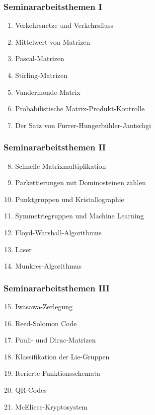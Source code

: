 %
%
%
\begin{frame}
\frametitle{Seminararbeitsthemen I}
\begin{enumerate}[<+->]
\item
Verkehrsnetze und Verkehrsfluss
\item
Mittelwert von Matrizen
\item
Pascal-Matrizen
\item 
Stirling-Matrizen
\item
Vandermonde-Matrix
\item
Probabilistische Matrix-Produkt-Kontrolle
\item
Der Satz von Furrer-Hungerbühler-Jantschgi
\end{enumerate}
\end{frame}

\begin{frame}
\frametitle{Seminararbeitsthemen II}
\begin{enumerate}[<+->]
\setcounter{enumi}{7}
\item
Schnelle Matrixmultiplikation
\item
Parkettierungen mit Dominosteinen zählen
\item
Punktgruppen und Kristallographie
\item
Symmetriegruppen und Machine Learning
\item
Floyd-Warshall-Algorithmus
\item
Laser
\item
Munkres-Algorithmus
\end{enumerate}
\end{frame}

\begin{frame}
\frametitle{Seminararbeitsthemen III}
\begin{enumerate}[<+->]
\setcounter{enumi}{14}
\item
Iwasawa-Zerlegung
\item 
Reed-Solomon Code
\item
Pauli- und Dirac-Matrizen
\item
Klassifikation der Lie-Gruppen
\item
Iterierte Funktionsschemata
\item
QR-Codes
\item
McEliece-Kryptosystem
\end{enumerate}
\end{frame}
